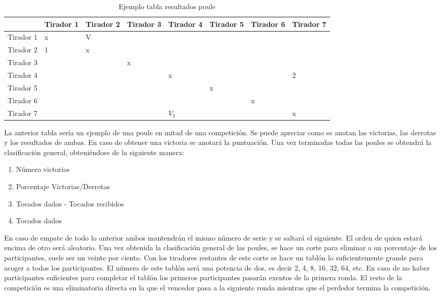 \begin{table}[htb]%
  \centering
  \caption{Ejemplo tabla resultados poule}
  \label{tab:anchura}
  \begin{tabular}{ | l | l | l | l | l | l | l | l | }
    \hline
    & Tirador 1 & Tirador 2 & Tirador 3 & Tirador 4 & Tirador 5 & Tirador 6 & Tirador 7 \\ \hline
    Tirador 1 & x & V & & & & & \\ \hline
    Tirador 2 & 1 & x & & & & & \\ \hline
    Tirador 3 & & & x & & & & \\ \hline
    Tirador 4 & & & & x & & & 2 \\ \hline
    Tirador 5 & & & & & x & & \\ \hline
    Tirador 6 & & & & & & x & \\ \hline
    Tirador 7 & & & & $V_3$ & & & x \\
    \hline
  \end{tabular}
\end{table}

La anterior tabla sería un ejemplo de una poule en mitad de una competición. Se puede apreciar como se anotan
 las victorias, las derrotas y los resultados de ambas. En caso de obtener una victoria se anotará la puntuación. Una vez
 terminadas todas las poules se obtendrá la clasificación general, obteniéndose de la siguiente manera:

\begin{enumerate}
  \item Número victorias
  \item Porcentaje Victorias/Derrotas
  \item Tocados dados - Tocados recibidos
  \item Tocados dados
\end{enumerate}

En caso de empate de todo lo anterior ambos mantendrán el mismo número de serie y se saltará el siguiente. El orden de
 quien estará encima de otro será aleatorio. Una vez obtenida la clasificación general de las poules, se hace un corte
 para eliminar a un porcentaje de los participantes, suele ser un veinte por ciento. Con los tiradores restantes
 de este corte se hace un tablón lo suficientemente grande para acoger a todos los participantes. El número de este
 tablón será una potencia de dos, es decir 2, 4, 8, 16, 32, 64, etc. En caso de no haber participantes suficientes para completar
 el tablón los primeros participantes pasarán exentos de la primera ronda. El resto de la competición es una eliminatoria
 directa en la que el vencedor pasa a la siguiente ronda mientras que el perdedor termina la competición.

